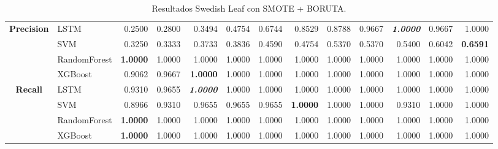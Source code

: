 \begin{table}[H]
\begin{adjustbox}{max width=14cm}
\begin{tabular}{|c|l|r|r|r|r|r|r|r|r|r|r|r|}
		\hline
		\textbf{Precision} &  LSTM &  0.2500 &  0.2800 &  0.3494 &  0.4754 &  0.6744 &  0.8529 &  0.8788 &  0.9667 & \textit{ \textbf{  1.0000 } } &  0.9667 &  1.0000 \\
		&  SVM &  0.3250 &  0.3333 &  0.3733 &  0.3836 &  0.4590 &  0.4754 &  0.5370 &  0.5370 &  0.5400 &  0.6042 & \textbf{  0.6591 } \\
		&  RandomForest & \textbf{  1.0000 } &  1.0000 &  1.0000 &  1.0000 &  1.0000 &  1.0000 &  1.0000 &  1.0000 &  1.0000 &  1.0000 &  1.0000 \\
		&  XGBoost &  0.9062 &  0.9667 & \textbf{  1.0000 } &  1.0000 &  1.0000 &  1.0000 &  1.0000 &  1.0000 &  1.0000 &  1.0000 &  1.0000 \\
		\hline
		\textbf{Recall} &  LSTM &  0.9310 &  0.9655 & \textit{ \textbf{  1.0000 } } &  1.0000 &  1.0000 &  1.0000 &  1.0000 &  1.0000 &  1.0000 &  1.0000 &  1.0000 \\
		&  SVM &  0.8966 &  0.9310 &  0.9655 &  0.9655 &  0.9655 & \textbf{  1.0000 } &  1.0000 &  1.0000 &  0.9310 &  1.0000 &  1.0000 \\
		&  RandomForest & \textbf{  1.0000 } &  1.0000 &  1.0000 &  1.0000 &  1.0000 &  1.0000 &  1.0000 &  1.0000 &  1.0000 &  1.0000 &  1.0000 \\
		&  XGBoost & \textbf{  1.0000 } &  1.0000 &  1.0000 &  1.0000 &  1.0000 &  1.0000 &  1.0000 &  1.0000 &  1.0000 &  1.0000 &  1.0000 \\
		\hline
	\end{tabular}
\end{adjustbox}
\caption{Resultados Swedish Leaf con SMOTE + BORUTA.}
\label{tab:SLeaf_SMOTE_BORUTA}
\end{table}

